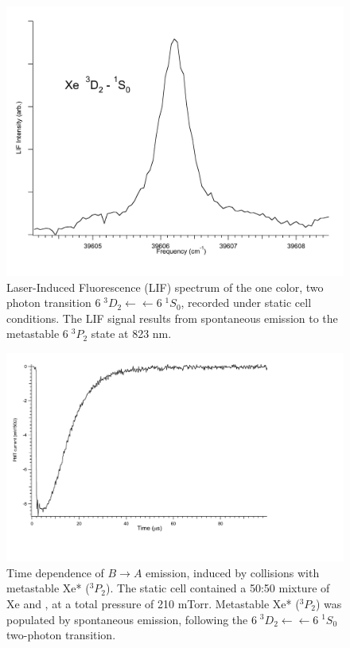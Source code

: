 \documentclass[12pt]{mitthesis}
\begin{document}
\begin{figure}
\end{figure}

\begin{figure}
  \caption{Laser-Induced Fluorescence (LIF) spectrum of the one color,
    two photon transition  $6\;^3D_2 \leftarrow \leftarrow
    6\;^1S_0$, recorded under static cell conditions.  The LIF signal
    results from spontaneous emission to the metastable $6\;^3P_2$
    state at 823 nm.}
  \label{fig:xe3d2-cell}
  \centering
  \includegraphics[width=6in]{Xe3D2-cell.pdf}
\end{figure}

\begin{figure}
  \caption{Time dependence of  $B \rightarrow A$ emission,
    induced by collisions with metastable Xe* ($^3P_2$).  The static
    cell contained a 50:50 mixture of Xe and , at a total
    pressure of 210 mTorr.  Metastable Xe* ($^3P_2$) was populated by
    spontaneous emission, following the $6\;^3D_2 \leftarrow
    \leftarrow 6\;^1S_0$ two-photon transition.}
  \label{fig:xen2-firstlight}
  \centering
  \includegraphics[width=7in,trim=2cm 0 1in 0]{XeN2-firstlight.pdf}
\end{figure}
\end{document}
